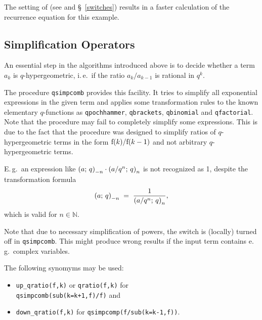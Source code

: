 The setting of 
(see \cite{PauleRiese:95} and \S~\ref{switches})
results in a faster
calculation of the recurrence equation for this example.



\subsection{Simplification Operators}
\label{qsum:simplification}

An essential step in the algorithms introduced above is to decide
whether a term $a_k$ is $q$-hypergeometric, i.\,e.\ if the
ratio $a_{k}/a_{k-1}$ is rational in $q^k$.

The procedure \texttt{qsimpcomb} provides this facility. It tries to
simplify all exponential expressions in the given term and applies
some transformation rules to the known elementary $q$-functions
as \texttt{qpochhammer}, \texttt{qbrackets}, \texttt{qbinomial}
and \texttt{qfactorial}. Note that the procedure may fail to
completely simplify some expressions. This is due to the fact that the
procedure was designed to simplify ratios of $q$-hypergeometric
terms in the form ${\mathrm f}(k)/{\mathrm f}(k-1)$ and not arbitrary
$q$-hypergeometric terms.

E.\,g.\ an expression like
$\left(a;\,q\right)_{-n}\cdot\left(a/q^n;\,q\right)_{n}$
is not recognized as 1, despite the transformation formula
\[ \left(a;\,q\right)_{-n} \;=\; \frac{1}{\left(a/q^n;\,q\right)_{n}},\]
which is valid for $n\in\mathbb{N}$.

Note that due to necessary simplification of powers, the switch
 is (locally) turned off in \texttt{qsimpcomb}. This
might produce wrong results if the input term contains
e.\,g.\ complex variables.

The following synomyms may be used:
\begin{itemize}
	\item \texttt{up\_qratio(f,k)} or \texttt{qratio(f,k)} for \\
		\texttt{qsimpcomb(sub(k=k+1,f)/f)} and
	\item \texttt{down\_qratio(f,k)} for \texttt{qsimpcomp(f/sub(k=k-1,f))}.
\end{itemize}


